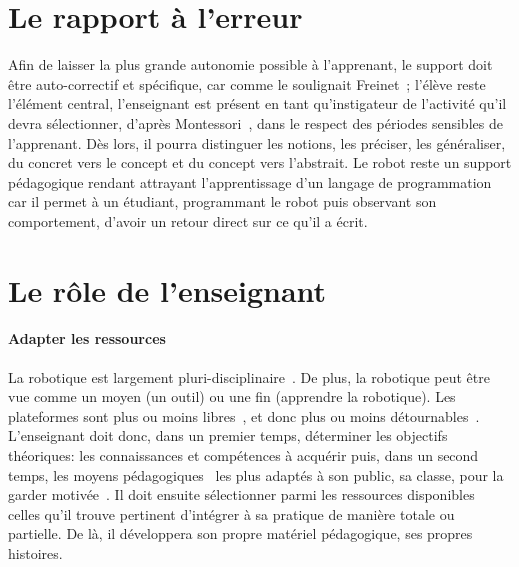 \section{Le rapport à l'erreur}\label{sec:erreur}
    Afin de laisser la plus grande autonomie possible à l'apprenant, le support doit être auto-correctif et spécifique, car comme le soulignait Freinet~; l'élève reste l'élément central, l'enseignant est présent en tant qu'instigateur de l'activité qu'il devra sélectionner, d'après Montessori~, dans le respect des périodes sensibles de l'apprenant. Dès lors, il pourra distinguer les notions, les préciser, les généraliser, du concret vers le concept et du concept vers l'abstrait. 
    Le robot reste un support pédagogique rendant attrayant l'apprentissage d'un langage de programmation car il permet à un étudiant, programmant le robot puis observant son comportement, d'avoir un retour direct sur ce qu'il a écrit.
\section{Le rôle de l'enseignant}
    \paragraph{Adapter les ressources} 
        La robotique est largement pluri-disciplinaire~. De plus, la robotique peut être vue comme un moyen (un outil) ou une fin (apprendre la robotique). Les plateformes sont plus ou moins libres~, et donc plus ou moins détournables~. L'enseignant doit donc, dans un premier temps, déterminer les objectifs théoriques: les connaissances et compétences à acquérir  puis, dans un second temps, les moyens pédagogiques~ les plus adaptés à son public, sa classe, pour la garder motivée~. Il doit ensuite sélectionner parmi les ressources disponibles~ celles qu'il trouve pertinent d'intégrer à sa pratique de manière totale ou partielle. De là, il développera son propre matériel pédagogique, ses propres histoires.
